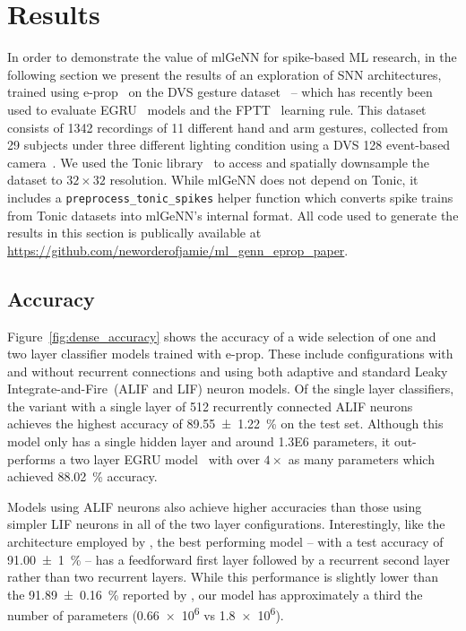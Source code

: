 \documentclass[sigconf]{acmart}
\begin{document}
\section{Results}
In order to demonstrate the value of mlGeNN for spike-based ML research, in the following section we present the results of an exploration of SNN architectures, trained using e-prop~\citep{Bellec2020} on the DVS gesture dataset~\citep{amir_low_2017} -- which has recently been used to evaluate EGRU~\citep{subramoney2022egru} models and the FPTT~\citep{yin2021accurate} learning rule.
This dataset consists of \num{1342} recordings of \num{11} different hand and arm gestures, collected from \num{29} subjects under three different lighting condition using a DVS 128 event-based camera~\citep{lichtsteiner_128times128_2008}.
We used the Tonic library~\citep{lenz_gregor_2021_5079802} to access and spatially downsample the dataset to $32\times32$ resolution.
While mlGeNN does not depend on Tonic, it includes a \lstinline{preprocess_tonic_spikes} helper function which converts spike trains from Tonic datasets into mlGeNN's internal format.
All code used to generate the results in this section is publically available at \url{https://github.com/neworderofjamie/ml_genn_eprop_paper}.

\subsection{Accuracy}
Figure~\ref{fig:dense_accuracy} shows the accuracy of a wide selection of one and two layer classifier models trained with e-prop.
These include configurations with and without recurrent connections and using both adaptive and standard Leaky Integrate-and-Fire~(ALIF and LIF) neuron models.
Of the single layer classifiers, the variant with a single layer of 512 recurrently connected ALIF neurons achieves the highest accuracy of \SI{89.55 \pm 1.22}{\percent} on the test set.
Although this model only has a single hidden layer and around \num{1.3E6} parameters, it out-performs a two layer EGRU model~\citep{subramoney2022egru} with over $4\times$ as many parameters which achieved \SI{88.02}{\percent} accuracy.

Models using ALIF neurons also achieve higher accuracies than those using simpler LIF neurons in all of the two layer configurations.
Interestingly, like the architecture employed by \citet{yin2021accurate}, the best performing model -- with a test accuracy of \SI{91.00 \pm 1}{\percent} -- has a feedforward first layer followed by a recurrent second layer rather than two recurrent layers.
While this performance is slightly lower than the \SI{91.89 \pm 0.16}{\percent} reported by \citet{yin2021accurate}, our model has approximately a third the number of parameters (\num{0.66e6} vs \num{1.8e6}).
\end{document}
